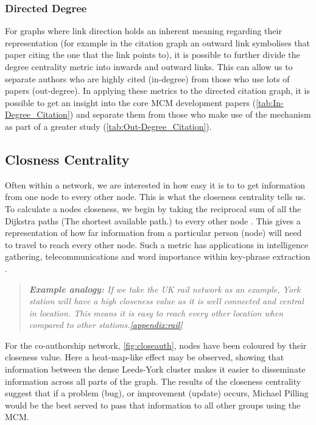 \subsubsection*{Directed Degree}
For graphs where link direction holds an inherent meaning regarding their representation (for example in the citation graph an outward link symbolises that paper citing the one that the link points to), it is possible to further divide the degree centrality metric into inwards and outward links. This can allow us to separate authors who are highly cited (in-degree) from those who use lots of papers (out-degree). In applying these metrics to the directed citation graph, it is possible to get an insight into the core MCM development papers (\autoref{tab:In-Degree_Citation}) and separate them from those who make use of the mechanism as part of a greater study (\autoref{tab:Out-Degree_Citation}).




\subsection{Closness Centrality}\label{sec:closeness}
Often within a network, we are interested in how easy it is to to get information from one node to every other node. This is what the closeness centrality tells us. To calculate a nodes closeness, we begin by taking the reciprocal sum of all the Dijkstra paths (The shortest available path.) to every other node \citep{closeness-book,closeness}.
This gives a representation of how far information from a particular person (node) will need to travel to reach every other node. Such a metric has applications in intelligence gathering, telecommunications and word importance within key-phrase extraction \citep{terror,examples_centrality,phrase}.

\begin{quote}
\textit{
\textbf{Example analogy:} If we take the UK rail network as an example, York station will have a high closeness value as it is well connected and central in location. This means it is easy to reach every other location when compared to other stations.\autoref{appendix:rail}
}
\end{quote}

For the co-authorship network, \autoref{fig:closeauth}, nodes have been coloured by their closeness value. Here a heat-map-like effect may be observed, showing that information between the dense Leeds-York cluster makes it easier to disseminate information across all parts of the graph. The results of the closeness centrality suggest that if a problem (bug), or improvement (update) occurs, Michael Pilling would be the best served to pass that information to all other groups using the MCM.

